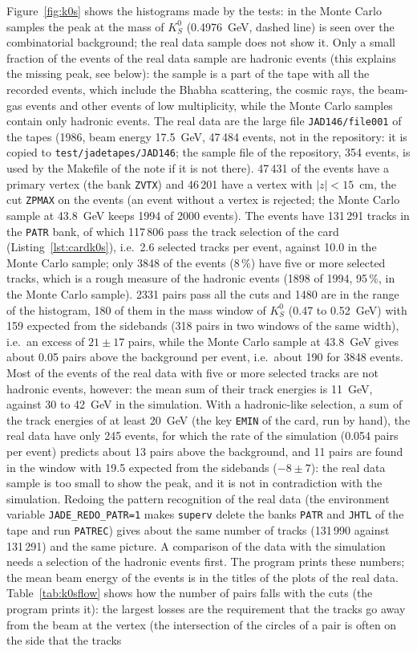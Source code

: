Figure~\ref{fig:k0s} shows the histograms made by the tests: in the Monte Carlo samples the peak at the mass of $K^0_S$ (0.4976~GeV, dashed line) is seen over the combinatorial background; the real data sample does not show it. Only a small fraction of the events of the real data sample are hadronic events (this explains the missing peak, see below): the sample is a part of the tape with all the recorded events, which include the Bhabha scattering, the cosmic rays, the beam-gas events and other events of low multiplicity, while the Monte Carlo samples contain only hadronic events. The real data are the large file \texttt{JAD146/file001} of the tapes (1986, beam energy 17.5~GeV, 47\,484 events, not in the repository: it is copied to \texttt{test/jadetapes/JAD146}; the sample file of the repository, 354 events, is used by the Makefile of the note if it is not there). 47\,431 of the events have a primary vertex (the bank \texttt{ZVTX}) and 46\,201 have a vertex with $|z|<15$~cm, the cut \texttt{ZPMAX} on the events (an event without a vertex is rejected; the Monte Carlo sample at 43.8~GeV keeps 1994 of 2000 events). The events have 131\,291 tracks in the \texttt{PATR} bank, of which 117\,806 pass the track selection of the card (Listing~\ref{lst:cardk0s}), i.e.\ 2.6 selected tracks per event, against 10.0 in the Monte Carlo sample; only 3848 of the events (8\,\%) have five or more selected tracks, which is a rough measure of the hadronic events (1898 of 1994, 95\,\%, in the Monte Carlo sample). 2331 pairs pass all the cuts and 1480 are in the range of the histogram, 180 of them in the mass window of $K^0_S$ (0.47 to 0.52~GeV) with 159 expected from the sidebands (318 pairs in two windows of the same width), i.e.\ an excess of $21\pm 17$ pairs, while the Monte Carlo sample at 43.8~GeV gives about 0.05 pairs above the background per event, i.e.\ about 190 for 3848 events. Most of the events of the real data with five or more selected tracks are not hadronic events, however: the mean sum of their track energies is 11~GeV, against 30 to 42~GeV in the simulation. With a hadronic-like selection, a sum of the track energies of at least 20~GeV (the key \texttt{EMIN} of the card, run by hand), the real data have only 245 events, for which the rate of the simulation (0.054 pairs per event) predicts about 13 pairs above the background, and 11 pairs are found in the window with 19.5 expected from the sidebands ($-8\pm 7$): the real data sample is too small to show the peak, and it is not in contradiction with the simulation. Redoing the pattern recognition of the real data (the environment variable \texttt{JADE\_REDO\_PATR=1} makes \texttt{superv} delete the banks \texttt{PATR} and \texttt{JHTL} of the tape and run \texttt{PATREC}) gives about the same number of tracks (131\,990 against 131\,291) and the same picture. A comparison of the data with the simulation needs a selection of the hadronic events first. The program prints these numbers; the mean beam energy of the events is in the titles of the plots of the real data. Table~\ref{tab:k0sflow} shows how the number of pairs falls with the cuts (the program prints it): the largest losses are the requirement that the tracks go away from the beam at the vertex (the intersection of the circles of a pair is often on the side that the tracks 
